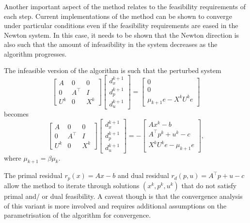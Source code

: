 Another important aspect of the method relates to the feasibility requirements of each step. Current implementations of the method can be shown to converge under particular conditions even if the feasibility requirements are eased in the Newton system. In this case, it needs to be shown that the Newton direction is also such that the amount of infeasibility in the system decreases as the algorithm progresses. 
	
The infeasible version of the algorithm is such that the perturbed system
	\begin{equation*} 	
		\begin{bmatrix} A  & 0 & 0 \\ 
						0  & A^\top & I \\ 
						U^k  & 0 & X^k 
		\end{bmatrix} 
		\begin{bmatrix} d_x^{k+1} \\ 
					    d_p^{k+1} \\ 
					    d_u^{k+1} 
		\end{bmatrix} =  
		\begin{bmatrix} 0 \\ 
						0 \\ 
						\mu_{k+1} e - X^k U^k e 
		\end{bmatrix} 
	\end{equation*} 
	becomes 
	\begin{equation}\label{p1c7:eq:infeasible_perturbed_system}
	\begin{bmatrix} A  & 0 & 0 \\ 
					0  & A^\top & I \\ 
					U^k & 0 & X^k 
	\end{bmatrix} 
	\begin{bmatrix}d_x^{k+1} \\ 
				   d_p^{k+1} \\ 
				   d_u^{k+1} 
	\end{bmatrix} = - 
	\begin{bmatrix} Ax^k - b \\ A^\top p^k + u^k - c \\ X^k U^ke -\mu_{k+1}e \end{bmatrix}, 
	\end{equation}
	where $\mu_{k+1} = \beta\mu_k$.

The primal residual $r_p(x) = Ax - b$ and dual residual $r_d(p,u) = A^\top p + u - c$ allow the method to iterate through solutions $(x^k, p^k, u^k)$ that do not satisfy primal and/ or dual feasibility. A caveat though is that the convergence analysis of this variant is more involved and requires additional assumptions on the parametrisation of the algorithm for convergence. 

